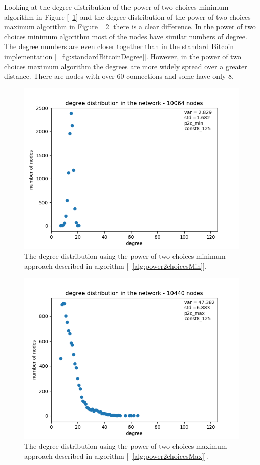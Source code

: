 \documentclass[a4paper, oneside]{discothesis}
\begin{document}
Looking at the degree distribution of the power of two choices minimum algorithm in Figure [~\ref{fig:p2cMinDegree}] and the degree distribution of the power of two choices maximum algorithm in Figure [~\ref{fig:p2cMaxDegree}] there is a clear difference. In the power of two choices minimum algorithm most of the nodes have similar numbers of degree. The degree numbers are even closer together than in the standard Bitcoin implementation [~\ref{fig:standardBitcoinDegree}]. However, in the power of two choices maximum algorithm the degrees are more widely spread over a greater distance. There are nodes with over 60 connections and some have only 8.

\begin{figure}
    \centering
    \includegraphics[width=.8\columnwidth]{figures/power2choices/p2c-min/degree-distribution-10064-nodes.png}
    \caption{The degree distribution using the power of two choices minimum approach described in algorithm [~\ref{alg:power2choicesMin}].}
    \label{fig:p2cMinDegree}
\end{figure}

\begin{figure}
    \centering
    \includegraphics[width=.8\columnwidth]{figures/power2choices/p2c-max/degree-distribution-10440-nodes.png}
    \caption{The degree distribution using the power of two choices maximum approach described in algorithm [~\ref{alg:power2choicesMax}].}
    \label{fig:p2cMaxDegree}
\end{figure}
\end{document}
